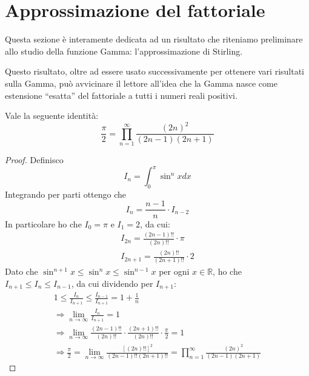 \section{Approssimazione del fattoriale}
Questa sezione è interamente dedicata ad un risultato che riteniamo preliminare allo studio della funzione Gamma:
l'approssimazione di Stirling.

Questo risultato, oltre ad essere usato successivamente per ottenere vari risultati sulla Gamma, può avvicinare il lettore
all'idea che la Gamma nasce come estensione ``esatta'' del fattoriale a tutti i numeri reali positivi.

\begin{lemma}\label{f:WallisProduct}
	Vale la seguente identità:
	\begin{equation*}
		\frac{\pi}{2}=\prod_{n=1}^\infty\frac{(2n)^2}{(2n-1)(2n+1)}
	\end{equation*}
\end{lemma}
\begin{proof}
	Definisco
	\begin{equation*}
		I_n=\int_0^\pi \sin^n{x} dx
	\end{equation*}
	Integrando per parti ottengo che
	\begin{equation*}
		I_n=\frac{n-1}{n}\cdot I_{n-2}
	\end{equation*}
	In particolare ho che $I_0=\pi$ e $I_1=2$, da cui:
	\begin{gather*}
		I_{2n}=\frac{(2n-1)!!}{(2n)!!}\cdot\pi\\
		I_{2n+1}=\frac{(2n)!!}{(2n+1)!!}\cdot 2
	\end{gather*}
	Dato che $\sin^{n+1}x\le \sin^n x\le \sin^{n-1} x$ per ogni $x\in\mathbb{R}$, ho che $I_{n+1}\le I_n\le I_{n-1}$,
	da cui dividendo per $I_{n+1}$:
	\begin{gather*}
		1\le \frac{I_n}{I_{n+1}}\le \frac{I_{n-1}}{I_{n+1}}=1+\frac{1}{n}\\
		\Longrightarrow \lim_{n\to\infty}\frac{I_n}{I_{n+1}}=1\\
		\Longrightarrow \lim_{n\to\infty}\frac{(2n-1)!!}{(2n)!!}\cdot\frac{(2n+1)!!}{(2n)!!}\cdot\frac{\pi}{2}=1\\
		\Longrightarrow \frac{\pi}{2}=\lim_{n\to\infty}\frac{\left[(2n)!!\right]^2}{(2n-1)!!(2n+1)!!}=\prod_{n=1}^\infty\frac{(2n)^2}{(2n-1)(2n+1)}
	\end{gather*}
\end{proof}


